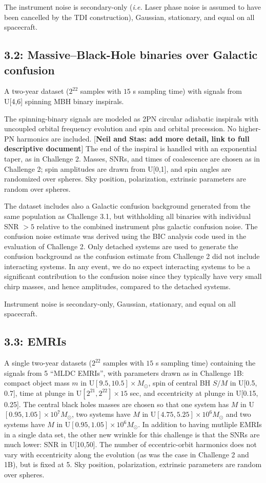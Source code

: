 \documentclass[11pt]{article}
\begin{document}
The instrument noise is secondary-only ({\it i.e.} Laser phase noise is assumed to have been cancelled by the TDI
construction), Gaussian, stationary, and equal on all spacecraft. 

\subsection*{3.2: Massive--Black-Hole binaries over Galactic confusion}

A two-year dataset ($2^{22}$ samples with $15$ s sampling time) with signals from U[4,6] spinning MBH binary inspirals.

The spinning-binary signals are modeled as 2PN circular adiabatic inspirals with uncoupled orbital frequency evolution
and spin and orbital precession. No higher-PN harmonics are included. [\textbf{Neil and Stas: add more detail, link to full descriptive document}] The end of the inspiral is handled with an exponential taper, as in Challenge 2. Masses, SNRs, and times of coalescence
are chosen as in Challenge 2; spin amplitudes are drawn from U[0,1], and spin angles are randomized over spheres.
Sky position, polarization, extrinsic parameters are random over spheres.

The dataset includes also a Galactic confusion background generated from the same population as Challenge 3.1, but withholding
all binaries with individual SNR $> 5$ relative to the combined instrument plus galactic confusion
noise. The confusion noise estimate was derived using the BIC analysis code used in the evaluation of Challenge 2.
Only detached systems are used to generate the confusion background as the confusion estimate from Challenge 2 did
not include interacting systems. In any event, we do no expect interacting systems to be a significant contribution
to the confusion noise since they typically have very small chirp masses, and hence amplitudes, compared to the detached systems.

Instrument noise is secondary-only, Gaussian, stationary, and equal on all spacecraft. 

\subsection*{3.3: EMRIs}

A single two-year datasets ($2^{22}$ samples with $15$ s sampling time) containing the signals from 5 ``MLDC EMRIs'', with parameters drawn
as in Challenge 1B: compact object mass $m$ in U$[9.5, 10.5] \times M_{\odot}$, spin of central BH $S/M$ in U[0.5, 0.7], time at plunge
in U$[2^{21}, 2^{22}] \times 15$ sec, and eccentricity at plunge in U[0.15, 0.25]. The central black holes masses are chosen so that
one system has $M$ in U$[0.95, 1.05] \times 10^7 M_{\odot}$, two systems have $M$ in U$[4.75, 5.25] \times 10^6 M_{\odot}$ and
two systems have $M$ in U$[0.95, 1.05] \times 10^6 M_{\odot}$. In addition to having mutliple EMRIs in a single data set, the
other new wrinkle for this challenge is that the SNRs are much lower: SNR in U[10,50].
The number of eccentric-orbit harmonics does not vary with eccentricity
along the evolution (as was the case in Challenge 2 and 1B), but is fixed at 5. Sky position, polarization,
extrinsic parameters are random over spheres.
\end{document}
